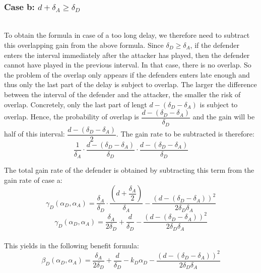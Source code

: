 \documentclass[journal,a4paper]{IEEEtran}
\begin{document}
~~ \\
\subsubsection*{\textbf{Case b:} $d + \delta_{A} \geq \delta_{D}$}
~~~\\

To obtain the formula in case of a too long delay, we therefore need to subtract this overlapping gain from the above formula. 
Since $\delta_{D} \geq \delta_{A}$, if the defender enters the interval immediately after the attacker has played, then the defender cannot have played in the previous interval. In that case, there is no overlap. So the problem of the overlap only appears if the defenders enters late enough and thus only the last part of the delay is subject to overlap. The larger the difference between the interval of the defender and the attacker, the smaller the risk of overlap. Concretely, only the last part of lengt $d - (\delta_{D} - \delta_{A})$ is subject to overlap. Hence, the probability of overlap is $\dfrac{ d - (\delta_{D} - \delta_{A})}{\delta_{D}}$ and the gain will be half of this interval:  $\dfrac{ d - (\delta_{D} - \delta_{A})}{2}$.  The gain rate to be subtracted is therefore:\\

\begin{equation}\label{first}
\dfrac{1} {\delta_{A}} \cdot \dfrac{d - (\delta_{D} - \delta_{A})}{\delta_{D}} \cdot \dfrac{d - (\delta_{D} - \delta_{A})}{\delta_{D}}
\end{equation}

The total gain  rate of the defender is obtained by subtracting this term from the gain rate of case a:
 \begin{equation}\label{first}
\gamma_{D}(\alpha_{D},\alpha_{A}) = \dfrac{\delta_{A}}{\delta_{D}} \cdot \dfrac{(d+\dfrac{\delta_{A}}{2})}{\delta_{A}} - \dfrac{(d - (\delta_{D} - \delta_{A}))^{2}}{2 \delta_{D} \delta_{A}}
\end{equation}
\begin{equation}\label{first}
\gamma_{D}(\alpha_{D},\alpha_{A}) = \dfrac{\delta_{A}}{2\delta_{D}} + \dfrac{d}{\delta_{D}} - \dfrac{(d - (\delta_{D} - \delta_{A}))^{2}}{2 \delta_{D} \delta_{A}}
\end{equation}\\
This yields in the following benefit formula:
\begin{equation}\label{first}
\beta_{D}(\alpha_{D},\alpha_{A}) = \dfrac{\delta_{A}}{2\delta_{D}} + \dfrac{d}{\delta_{D}} - k_{D} \alpha_{D} - \dfrac{(d - (\delta_{D} - \delta_{A}))^{2}}{2 \delta_{D} \delta_{A}}
\end{equation}\\
 
\end{document}
